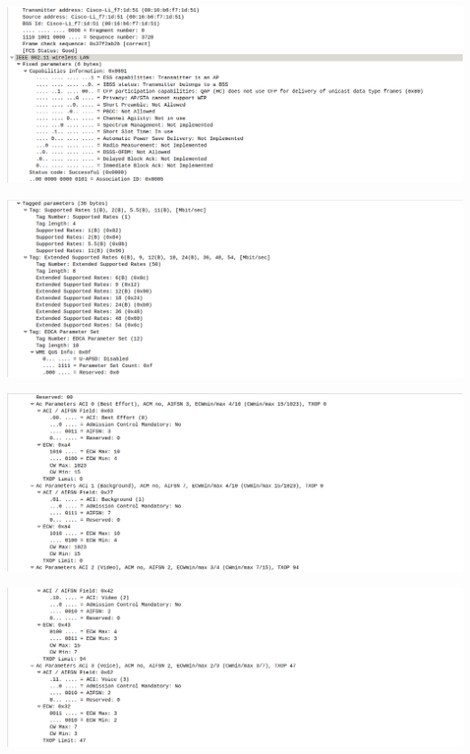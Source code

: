 \documentclass{article}
\begin{document}
\begin{center}
\includegraphics[scale=0.3]{WLAN/assres5.png}
\end{center}
\begin{center}
\includegraphics[scale=0.3]{WLAN/assres6.png}
\end{center}
\begin{center}
\includegraphics[scale=0.3]{WLAN/assres7.png}
\end{center}
\begin{center}
\includegraphics[scale=0.3]{WLAN/assres8.png}
\end{center}
\end{document}
